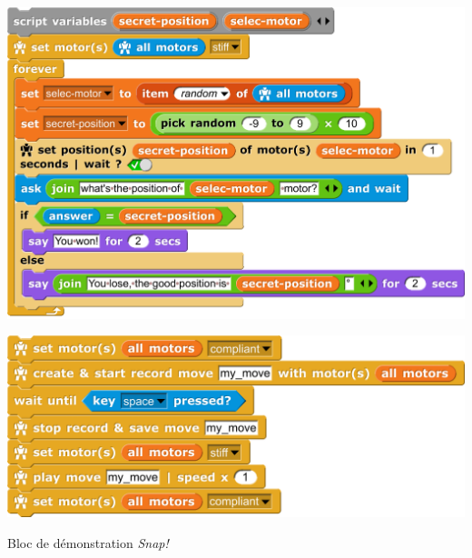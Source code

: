         \begin{code}
        \begin{minipage}{\linewidth}
            \includegraphics[width=0.9\linewidth]{Figures/prog-find_pos.png}
            \label{cod:prog_find_pos}
        \end{minipage}
        \strut\newline
        \begin{minipage}{\linewidth}
            \includegraphics[width=0.9\linewidth]{Figures/prog-mime.png}
            \label{cod:prog_mime}
        \end{minipage}
        \caption{Bloc de démonstration \textit{Snap!}}
        \end{code}\par%
